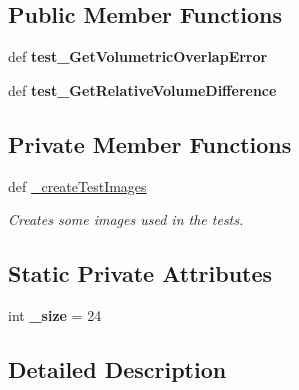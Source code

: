 \subsection*{Public Member Functions}
\begin{DoxyCompactItemize}
\item 
\hypertarget{classmedpy_1_1tests_1_1metric_1_1Volume_1_1TestVolumeClass_a6339b148e87a5b58312f90ae8afd6faa}{
def {\bfseries test\_\-GetVolumetricOverlapError}}
\label{classmedpy_1_1tests_1_1metric_1_1Volume_1_1TestVolumeClass_a6339b148e87a5b58312f90ae8afd6faa}

\item 
\hypertarget{classmedpy_1_1tests_1_1metric_1_1Volume_1_1TestVolumeClass_a071a3ee1de1a3dcab9e4644501c1b5aa}{
def {\bfseries test\_\-GetRelativeVolumeDifference}}
\label{classmedpy_1_1tests_1_1metric_1_1Volume_1_1TestVolumeClass_a071a3ee1de1a3dcab9e4644501c1b5aa}

\end{DoxyCompactItemize}
\subsection*{Private Member Functions}
\begin{DoxyCompactItemize}
\item 
def \hyperlink{classmedpy_1_1tests_1_1metric_1_1Volume_1_1TestVolumeClass_a23f94273ab3bf9772075a42a831210e4}{\_\-createTestImages}
\begin{DoxyCompactList}\small\item\em Creates some images used in the tests. \end{DoxyCompactList}\end{DoxyCompactItemize}
\subsection*{Static Private Attributes}
\begin{DoxyCompactItemize}
\item 
\hypertarget{classmedpy_1_1tests_1_1metric_1_1Volume_1_1TestVolumeClass_a44c8945493e1c3068fb8a0361bd2ce1a}{
int {\bfseries \_\-size} = 24}
\label{classmedpy_1_1tests_1_1metric_1_1Volume_1_1TestVolumeClass_a44c8945493e1c3068fb8a0361bd2ce1a}

\end{DoxyCompactItemize}


\subsection{Detailed Description}


